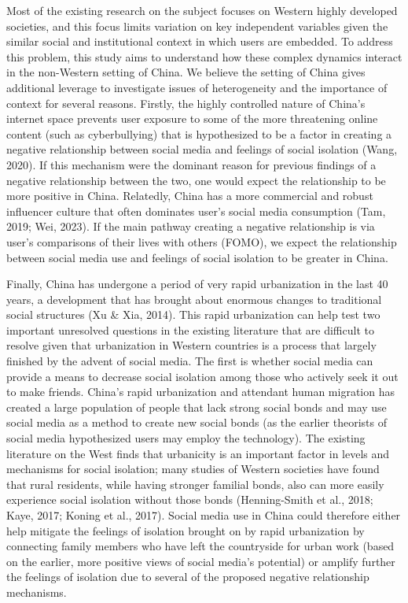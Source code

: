 \documentclass[
  letterpaper,
  DIV=11,
  numbers=noendperiod]{scrartcl}
\begin{document}
Most of the existing research on the subject focuses on Western highly
developed societies, and this focus limits variation on key independent
variables given the similar social and institutional context in which
users are embedded. To address this problem, this study aims to
understand how these complex dynamics interact in the non-Western
setting of China. We believe the setting of China gives additional
leverage to investigate issues of heterogeneity and the importance of
context for several reasons. Firstly, the highly controlled nature of
China's internet space prevents user exposure to some of the more
threatening online content (such as cyberbullying) that is hypothesized
to be a factor in creating a negative relationship between social media
and feelings of social isolation (Wang, 2020). If this mechanism were
the dominant reason for previous findings of a negative relationship
between the two, one would expect the relationship to be more positive
in China. Relatedly, China has a more commercial and robust influencer
culture that often dominates user's social media consumption (Tam, 2019;
Wei, 2023). If the main pathway creating a negative relationship is via
user's comparisons of their lives with others (FOMO), we expect the
relationship between social media use and feelings of social isolation
to be greater in China.

Finally, China has undergone a period of very rapid urbanization in the
last 40 years, a development that has brought about enormous changes to
traditional social structures (Xu \& Xia, 2014). This rapid urbanization
can help test two important unresolved questions in the existing
literature that are difficult to resolve given that urbanization in
Western countries is a process that largely finished by the advent of
social media. The first is whether social media can provide a means to
decrease social isolation among those who actively seek it out to make
friends. China's rapid urbanization and attendant human migration has
created a large population of people that lack strong social bonds and
may use social media as a method to create new social bonds (as the
earlier theorists of social media hypothesized users may employ the
technology). The existing literature on the West finds that urbanicity
is an important factor in levels and mechanisms for social isolation;
many studies of Western societies have found that rural residents, while
having stronger familial bonds, also can more easily experience social
isolation without those bonds (Henning-Smith et al., 2018; Kaye, 2017;
Koning et al., 2017). Social media use in China could therefore either
help mitigate the feelings of isolation brought on by rapid urbanization
by connecting family members who have left the countryside for urban
work (based on the earlier, more positive views of social media's
potential) or amplify further the feelings of isolation due to several
of the proposed negative relationship mechanisms.
\end{document}
